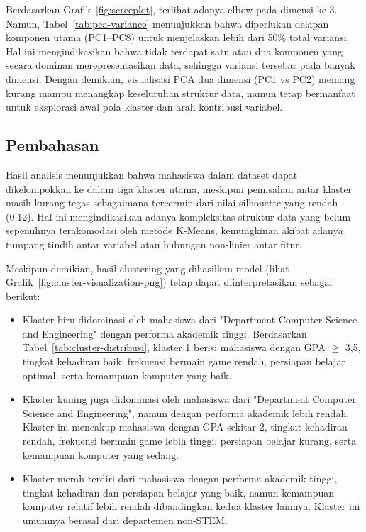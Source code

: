 Berdasarkan Grafik~\ref{fig:screeplot}, terlihat adanya elbow pada dimensi ke-3. Namun, Tabel~\ref{tab:pca-variance} menunjukkan bahwa diperlukan delapan komponen utama (PC1–PC8) untuk menjelaskan lebih dari 50\% total variansi. Hal ini mengindikasikan bahwa tidak terdapat satu atau dua komponen yang secara dominan merepresentasikan data, sehingga variansi tersebar pada banyak dimensi. Dengan demikian, visualisasi PCA dua dimensi (PC1 vs PC2) memang kurang mampu menangkap keseluruhan struktur data, namun tetap bermanfaat untuk eksplorasi awal pola klaster dan arah kontribusi variabel.
\pagebreak
\subsection{Pembahasan}
Hasil analisis menunjukkan bahwa mahasiswa dalam dataset dapat dikelompokkan ke dalam tiga klaster utama, meskipun pemisahan antar klaster masih kurang tegas sebagaimana tercermin dari nilai silhouette yang rendah (0.12). Hal ini mengindikasikan adanya kompleksitas struktur data yang belum sepenuhnya terakomodasi oleh metode K-Means, kemungkinan akibat adanya tumpang tindih antar variabel atau hubungan non-linier antar fitur.

Meskipun demikian, hasil clustering yang dihasilkan model (lihat Grafik~\ref{fig:cluster-visualization-png}) tetap dapat diinterpretasikan sebagai berikut:
\begin{itemize}
    \item Klaster biru didominasi oleh mahasiswa dari "Department Computer Science and Engineering" dengan performa akademik tinggi. Berdasarkan Tabel~\ref{tab:cluster-distribusi}, klaster 1 berisi mahasiswa dengan GPA $\geq$ 3{,}5, tingkat kehadiran baik, frekuensi bermain game rendah, persiapan belajar optimal, serta kemampuan komputer yang baik.
    \item Klaster kuning juga didominasi oleh mahasiswa dari "Department Computer Science and Engineering", namun dengan performa akademik lebih rendah. Klaster ini mencakup mahasiswa dengan GPA sekitar 2, tingkat kehadiran rendah, frekuensi bermain game lebih tinggi, persiapan belajar kurang, serta kemampuan komputer yang sedang.
    \item Klaster merah terdiri dari mahasiswa dengan performa akademik tinggi, tingkat kehadiran dan persiapan belajar yang baik, namun kemampuan komputer relatif lebih rendah dibandingkan kedua klaster lainnya. Klaster ini umumnya berasal dari departemen non-STEM.
    \end{itemize}

